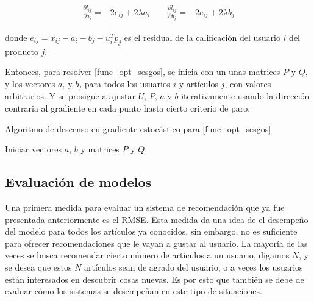 \[
\begin{split}
\frac{\partial l_{ij}}{\partial a_i} = -2 e_{ij} + 2 \lambda a_i 
\qquad
\frac{\partial l_{ij}}{\partial b_j} = -2 e_{ij} + 2 \lambda b_j
\end{split}
\]

donde $e_{ij} =  x_{ij} - a_i - b_j - u_i^T p_j$ es el residual de la calificación del usuario $i$ del producto $j$.

Entonces, para resolver \ref{func_opt_sesgos}, se inicia con un unas matrices $P$ y $Q$, y los vectores $a_i$ y $b_j$ para todos los usuarios $i$ y artículos $j$, con valores arbitrarios. Y se prosigue a ajustar $U$, $P$, $a$ y $b$ iterativamente usando la dirección contraria al gradiente en cada punto hasta cierto criterio de paro.

\begin{algorithm}[ht]
 \caption{Algoritmo de descenso en gradiente estocástico para \ref{func_opt_sesgos}}
    \SetAlgoLined
    Iniciar vectores $a$, $b$ y matrices $P$ y $Q$\\
\end{algorithm}

\subsection{Evaluación de modelos}\label{sec:evaluacion_modelos}

Una primera medida para evaluar un sistema de recomendación que ya fue presentada anteriormente es el RMSE. Esta medida da una idea de el desempeño del modelo para todos los artículos ya conocidos, sin embargo, no es suficiente para ofrecer recomendaciones que le vayan a gustar al usuario. La mayoría de las veces se busca recomendar cierto número de artículos a un usuario, digamos $N$, y se desea que estos $N$ artículos sean de agrado del usuario, o a veces los usuarios están interesados en descubrir cosas nuevas. Es por esto que también se debe de evaluar cómo los sistemas se desempeñan en este tipo de situaciones.

